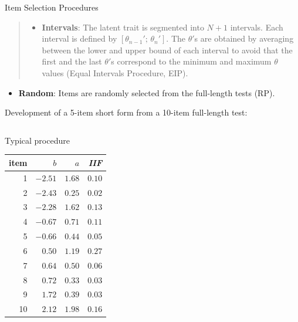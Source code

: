 \documentclass[final,t]{beamer}
\begin{document}
\begin{frame}
\begin{columns}[t]
\begin{column}{.45\linewidth}
\begin{block}{\centering Item Selection Procedures}
\begin{quote}
\begin{itemize}
					 			\item \textbf{Intervals}: The latent trait is segmented into $N + 1$ intervals. Each interval is defined by $[\theta_{n-1}'; \, \theta_n']$. 
					 			The $\theta'$s are obtained by averaging between the lower and upper bound of each interval
					 			to avoid that the first and the last $\theta'$s correspond to the minimum and maximum $\theta$ values (Equal Intervals Procedure, EIP).
					 		\end{itemize}
					 	\end{quote}
					 	\begin{itemize}
				 	\item \textbf{Random}: Items are randomly selected from the full-length tests (RP).
					 \end{itemize}
					 
					Development of a 5-item short form from a 10-item full-length test: 
					\begin{columns}
						\begin{column}{.50\linewidth}
								\centering 
								Typical procedure
						\begin{table}[ht]
								\centering
								\begin{tabular}{rrrr}
									\hline
									item & $b$ & $a$ & \emph{IIF} \\ 
									\hline
							\rowcolor{template!20!}1	& $	-2.51	$ & $	1.68	$ & $	0.10	$ \\
							\rowcolor{template!20!}2	& $	-2.43	$ & $	0.25	$ & $	0.02	$ \\
							3	& $	-2.28	$ & $	1.62	$ & $	0.13	$ \\
							\rowcolor{template!20!}4	& $	-0.67	$ & $	0.71	$ & $	0.11	$ \\
							5	& $	-0.66	$ & $	0.44	$ & $	0.05	$ \\
							\rowcolor{template!20!}6	& $	0.50	$ & $	1.19	$ & $	0.27	$ \\
							7	& $	0.64	$ & $	0.50	$ & $	0.06	$ \\
						\rowcolor{template!20!}	8	& $	0.72	$ & $	0.33	$ & $	0.03	$ \\
							9	& $	1.72	$ & $	0.39	$ & $	0.03	$ \\
							10	& $	2.12	$ & $	1.98	$ & $	0.16	$ \\
							 
									\hline
								\end{tabular}
							\end{table}
						\end{column}
					

\end{columns}
\end{block}
\end{column}
\end{columns}
\end{frame}
\end{document}
